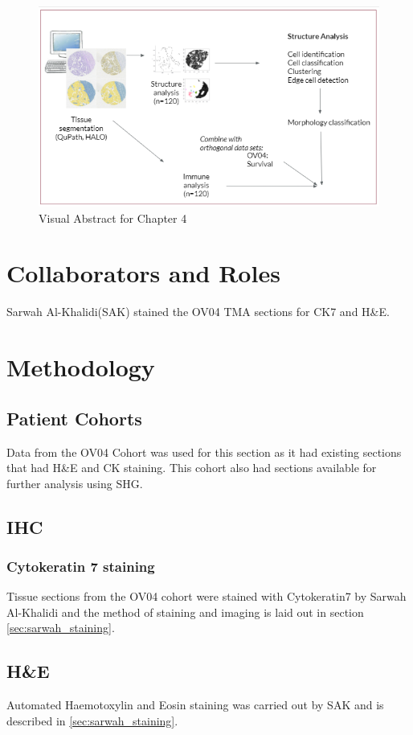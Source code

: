 \begin{figure}
    \centering
    \includegraphics{Chapter3/Figs/VAch2_2.png}
    \caption{Visual Abstract for Chapter 4}
    \label{fig:VA_ch4_2}
\end{figure}

\section{Collaborators and Roles}
Sarwah Al-Khalidi(SAK) stained the OV04 TMA sections for CK7 and H&E.

\section{Methodology}
\subsection{Patient Cohorts}
Data from the OV04 Cohort was used for this section as it had existing sections that had H\&E and CK staining. This cohort also had sections available for further analysis using SHG. 

\subsection{IHC}
\subsubsection{Cytokeratin 7 staining}
Tissue sections from the OV04 cohort were stained with Cytokeratin7 by Sarwah Al-Khalidi and the method of staining and imaging is laid out in section \ref{sec:sarwah_staining}.

\subsection{H\&E}
Automated Haemotoxylin and Eosin staining was carried out by SAK and is described in \ref{sec:sarwah_staining}. 

